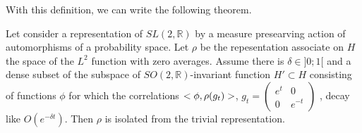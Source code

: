 With this definition, we can write the following theorem.

\begin{prop}
Let consider a representation of $SL(2,\mathbb{R})$ by a measure presearving action of automorphisms of a probability space. Let $\rho$ be the repesentation associate on $H$ the space of the $L^2$ function with zero averages. Assume there is $\delta \in ]0;1[$ and a dense subset of the subspace of $SO(2,\mathbb{R})$-invariant function $H' \subset H$ consisting of functions $\phi$ for which the correlations $<\phi, \rho(g_t) \time \phi>$, $g_t=\begin{pmatrix} e^t & 0 \\ 0 & e^{-t} \end{pmatrix} $
, decay like $O(e^{- \delta t})$. Then $\rho$ is isolated from the trivial representation.

\end{prop}
